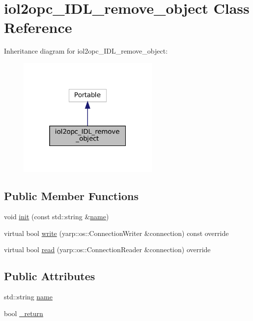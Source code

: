 \hypertarget{classiol2opc__IDL__remove__object}{}\section{iol2opc\+\_\+\+I\+D\+L\+\_\+remove\+\_\+object Class Reference}
\label{classiol2opc__IDL__remove__object}


Inheritance diagram for iol2opc\+\_\+\+I\+D\+L\+\_\+remove\+\_\+object\+:
\nopagebreak
\begin{figure}[H]
\begin{center}
\leavevmode
\includegraphics[width=196pt]{classiol2opc__IDL__remove__object__inherit__graph}
\end{center}
\end{figure}
\subsection*{Public Member Functions}
\begin{DoxyCompactItemize}
\item 
void \hyperlink{classiol2opc__IDL__remove__object_a73bef92405fbfad5f310d661917a223c}{init} (const std\+::string \&\hyperlink{classiol2opc__IDL__remove__object_a3f395fd298e83cb02069f71f1537124c}{name})
\item 
virtual bool \hyperlink{classiol2opc__IDL__remove__object_ad4d4138a076482a7a1c0d40f844e5ed7}{write} (yarp\+::os\+::\+Connection\+Writer \&connection) const override
\item 
virtual bool \hyperlink{classiol2opc__IDL__remove__object_a3930bc698e02f11567bed49b113a0de4}{read} (yarp\+::os\+::\+Connection\+Reader \&connection) override
\end{DoxyCompactItemize}
\subsection*{Public Attributes}
\begin{DoxyCompactItemize}
\item 
std\+::string \hyperlink{classiol2opc__IDL__remove__object_a3f395fd298e83cb02069f71f1537124c}{name}
\item 
bool \hyperlink{classiol2opc__IDL__remove__object_a5e3f3951c6a4fdb1153490c1cb9452b5}{\+\_\+return}
\end{DoxyCompactItemize}


